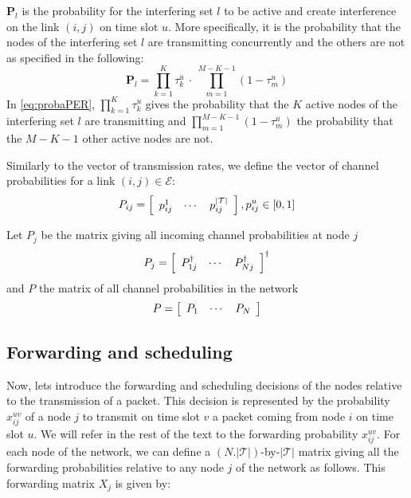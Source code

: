 \documentclass[a4paper]{article}
\newcommand{\T}{\mathcal{T}}
\newcommand{\E}{\mathcal{E}}
\begin{document}
$\mathbf{P}_l$ is the probability for the interfering set $l$ to be active and create interference on the link $(i,j)$ on time slot $u$. More specifically, it is the probability that the nodes of the interfering set $l$ are transmitting concurrently and the others are not as specified in the following:
\begin{equation}
\mathbf{P}_l = \prod_{k=1}^K \tau_k^u~\cdot~\prod_{m=1}^{M-K-1}(1-\tau_m^u)
\label{eq:probaPER}
\end{equation}
In \eqref{eq:probaPER}, $\prod_{k=1}^K \tau_k^u$ gives the probability that the $K$ active nodes of the interfering set $l$ are transmitting and $\prod_{m=1}^{M-K-1}(1-\tau_m^u)$ the probability that the $M-K-1$ other active nodes are not.

Similarly to the vector of transmission rates, we define the vector of channel probabilities for a link $(i,j) \in \E$:
\[ P_{ij} = \left[
	\begin{array}{c c c}
		p_{ij}^1 & \cdots & p_{ij}^{|\T|} \\
	\end{array}
\right]
, p_{ij}^u \in \left[0,1\right] \]

Let $P_j$ be the matrix giving all incoming channel probabilities at node $j$
\[
P_j = \left[ 
 	\begin{array}{c c c}
		P_{1j}^\dagger &
		\cdots &
		P_{Nj}^\dagger \\
 	\end{array}
\right]^{\dagger}
\]
and $P$ the matrix of all channel probabilities in the network 
\[
P = \left[ 
 	\begin{array}{c c c}
		P_{1} &
		\cdots &
		P_{N} \\
 	\end{array}
\right]
\]






\subsection{Forwarding and scheduling}

Now, lets introduce the forwarding and scheduling decisions of the nodes relative to the transmission of a packet. This decision is represented by the probability $x_{ij}^{uv}$ of a node $j$ to transmit on time slot $v$ a packet coming from node $i$ on time slot $u$. We will refer in the rest of the text to the forwarding probability  $x_{ij}^{uv}$. 
For each node of the network, we can define a $(N.|\T|)$-by-$|\T|$ matrix giving all the forwarding probabilities relative to any node $j$ of the network as follows. This forwarding matrix $X_j$ is given by:
\end{document}

